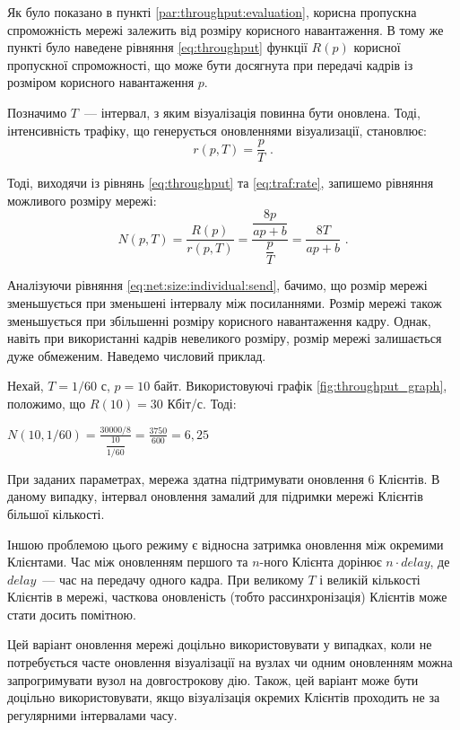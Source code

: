 \documentclass[a4paper,ukrainian,utf8,nocolumnsxix,floatsection,equationsection]{eskdtext}
\begin{document}
Як було показано в пункті \ref{par:throughput:evaluation}, корисна пропускна спроможність мережі залежить від розміру корисного навантаження. В тому же пункті було наведене рівняння \ref{eq:throughput} функції $R(p)$ корисної пропускної спроможності, що може бути досягнута при передачі кадрів із розміром корисного навантаження $p$. 

Позначимо $T$~--- інтервал, з яким візуалізація повинна бути оновлена. Тоді, інтенсивність трафіку, що генерується оновленнями візуализації, становлює:
\begin{equation}\label{eq:traf:rate}
	r(p, T) = \frac{p}{T}  \text{ .}
\end{equation}

Тоді, виходячи із рівнянь \ref{eq:throughput} та \ref{eq:traf:rate}, запишемо рівняння можливого розміру мережі:
\begin{equation}\label{eq:net:size:individual:send}
	N(p, T) = \frac{R(p)}{r(p, T)} = \frac{\dfrac{8p}{ap+b}}{\dfrac{p}{T}} = \frac{8T}{ap + b} \text{ .}
\end{equation}

Аналізуючи рівняння \ref{eq:net:size:individual:send}, бачимо, що розмір мережі зменьшується при зменьшені інтервалу між посиланнями. Розмір мережі також зменьшується при збільшенні розміру корисного навантаження кадру. Однак, навіть при використанні кадрів невеликого розміру, розмір мережі залишається дуже обмеженим. Наведемо числовий приклад.

Нехай, $T=1/60$ с, $p = 10$ байт. Використовуючі графік \ref{fig:throughput_graph}, положимо, що $R(10) = 30$ Кбіт/с. Тоді:

$N(10, 1/60) = \frac{30000 / 8}{\dfrac{10}{1/60}} = \frac{3750}{600} = 6,25$


При заданих параметрах, мережа здатна підтримувати оновлення 6 Клієнтів. В даному випадку, інтервал оновлення замалий для підримки мережі Клієнтів більшої кількості.

Іншою проблемою цього режиму є відносна затримка оновлення між окремими Клієнтами. Час між оновленням першого та $n$-ного Клієнта дорінює $n \cdot delay$, де $delay$~--- час на передачу одного кадра. При великому $T$ і великій кількості Клієнтів в мережі, часткова оновленість (тобто рассинхронізація) Клієнтів може стати досить помітною.

Цей варіант оновлення мережі доцільно використовувати у випадках, коли не потребується часте оновлення візуалізації на вузлах чи одним оновленням можна запрогримувати вузол на довгострокову дію. Також, цей варіант може бути доцільно використовувати, якщо візуалізація окремих Клієнтів проходить не за регулярними інтервалами часу.
\end{document}
